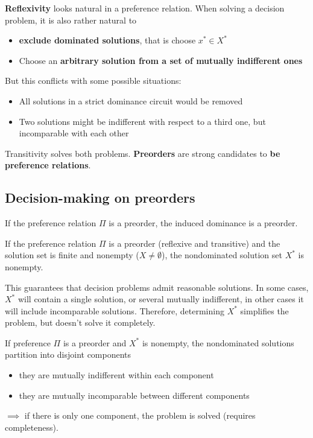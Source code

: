 \textbf{Reflexivity} looks natural in a preference relation. When solving a decision problem, it is also rather natural to 
\begin{itemize}
	\item \textbf{exclude dominated solutions}, that is choose $x^\ast \in X^\ast$
	
	\item Choose an \textbf{arbitrary solution from a set of mutually indifferent ones}
\end{itemize}

But this conflicts with some possible situations: 
\begin{itemize}
	\item All solutions in a strict dominance circuit would be removed
	
	\item Two solutions might be indifferent with respect to a third one, but incomparable with each other
\end{itemize}

Transitivity solves both problems. \textbf{Preorders} are strong candidates to \textbf{be preference relations}.

\subsection{Decision-making on preorders}
\label{subsec:decisionmakingpreorders}

\begin{theo}
	If the preference relation $\Pi$ is a preorder, the induced dominance is a preorder. \\
\end{theo}

\begin{theo}
	If the preference relation $\Pi$ is a preorder (reflexive and transitive) and the solution set is finite and nonempty ($X \neq \emptyset$), the nondominated solution set $X^\ast$ is nonempty.
\end{theo}

This guarantees that decision problems admit reasonable solutions. In some cases, $X^\ast$ will contain a single solution, or several mutually indifferent, in other cases it will include incomparable solutions. Therefore, determining $X^\ast$ simplifies the problem, but doesn't solve it completely.

\begin{theo}
	If preference $\Pi$ is a preorder and $X^\ast$ is nonempty, the nondominated solutions partition into disjoint components
	\begin{itemize}
		\item they are mutually indifferent within each component
		
		\item they are mutually incomparable between different components
	\end{itemize}
	$\implies$ if there is only one component, the problem is solved (requires completeness).
\end{theo}

